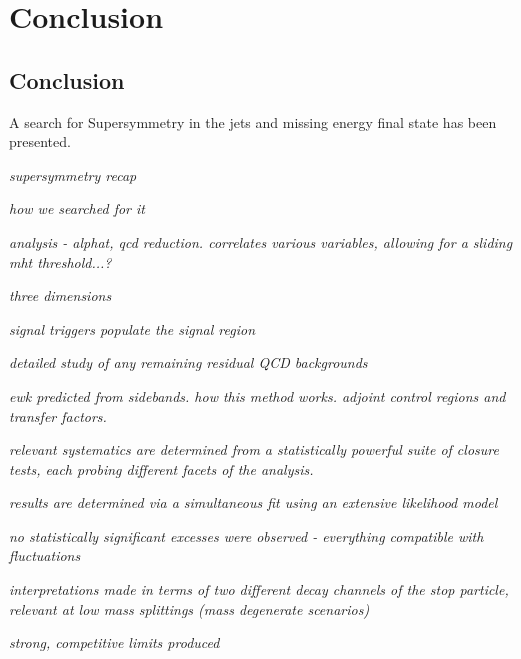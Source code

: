 \chapter{Conclusion}

\ifpdf
    \graphicspath{{Chapter10/Figs/Raster/}{Chapter10/Figs/PDF/}{Chapter10/Figs/}}
\else
    \graphicspath{{Chapter10/Figs/Vector/}{Chapter10/Figs/}}
\fi


\section{Conclusion}  %


A search for Supersymmetry in the jets and missing energy final state has been
presented.

\emph{supersymmetry recap}

\emph{how we searched for it}

\emph{analysis - alphat, qcd reduction. correlates various variables, allowing
for a sliding mht threshold...?}

\emph{three dimensions}

\emph{signal triggers populate the signal region}

\emph{detailed study of any remaining residual QCD backgrounds}

\emph{ewk predicted from sidebands. how this method works. adjoint control
regions and transfer factors.}

\emph{relevant systematics are determined from a statistically powerful suite
of closure tests, each probing different facets of the analysis.}

\emph{results are determined via a simultaneous fit using an extensive
likelihood model}

\emph{no statistically significant excesses were observed - everything
compatible with fluctuations}

\emph{interpretations made in terms of two different decay channels of the stop
particle, relevant at low mass splittings (mass degenerate scenarios)}

\emph{strong, competitive limits produced}

